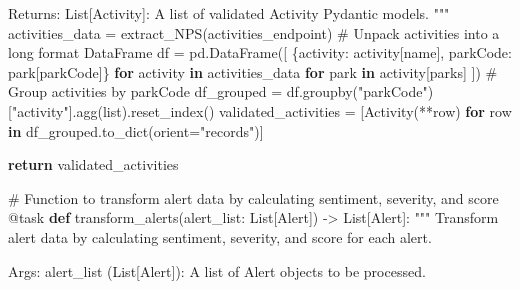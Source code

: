 \documentclass[
  letterpaper,
  DIV=11,
  numbers=noendperiod]{scrartcl}
\newenvironment{Shaded}{\begin{snugshade}}{\end{snugshade}}
\newcommand{\AttributeTok}[1]{\textcolor[rgb]{0.40,0.45,0.13}{#1}}
\newcommand{\BuiltInTok}[1]{\textcolor[rgb]{0.00,0.23,0.31}{#1}}
\newcommand{\CommentTok}[1]{\textcolor[rgb]{0.37,0.37,0.37}{#1}}
\newcommand{\ControlFlowTok}[1]{\textcolor[rgb]{0.00,0.23,0.31}{\textbf{#1}}}
\newcommand{\KeywordTok}[1]{\textcolor[rgb]{0.00,0.23,0.31}{\textbf{#1}}}
\newcommand{\NormalTok}[1]{\textcolor[rgb]{0.00,0.23,0.31}{#1}}
\newcommand{\OperatorTok}[1]{\textcolor[rgb]{0.37,0.37,0.37}{#1}}
\newcommand{\StringTok}[1]{\textcolor[rgb]{0.13,0.47,0.30}{#1}}
\begin{document}
\begin{Shaded}
\begin{Highlighting}[]
\CommentTok{    Returns:}
\CommentTok{        List[Activity]: A list of validated Activity Pydantic models.}
\CommentTok{    """}
\NormalTok{    activities\_data }\OperatorTok{=}\NormalTok{ extract\_NPS(activities\_endpoint)}
    \CommentTok{\# Unpack activities into a long format DataFrame}
\NormalTok{    df }\OperatorTok{=}\NormalTok{ pd.DataFrame([}
\NormalTok{        \{}\StringTok{\textquotesingle{}activity\textquotesingle{}}\NormalTok{: activity[}\StringTok{\textquotesingle{}name\textquotesingle{}}\NormalTok{], }\StringTok{\textquotesingle{}parkCode\textquotesingle{}}\NormalTok{: park[}\StringTok{\textquotesingle{}parkCode\textquotesingle{}}\NormalTok{]\}}
        \ControlFlowTok{for}\NormalTok{ activity }\KeywordTok{in}\NormalTok{ activities\_data}
        \ControlFlowTok{for}\NormalTok{ park }\KeywordTok{in}\NormalTok{ activity[}\StringTok{\textquotesingle{}parks\textquotesingle{}}\NormalTok{]}
\NormalTok{    ])}
    \CommentTok{\# Group activities by parkCode}
\NormalTok{    df\_grouped }\OperatorTok{=}\NormalTok{ df.groupby(}\StringTok{"parkCode"}\NormalTok{)[}\StringTok{"activity"}\NormalTok{].agg(}\BuiltInTok{list}\NormalTok{).reset\_index()}
\NormalTok{    validated\_activities }\OperatorTok{=}\NormalTok{ [Activity(}\OperatorTok{**}\NormalTok{row) }\ControlFlowTok{for}\NormalTok{ row }\KeywordTok{in}\NormalTok{ df\_grouped.to\_dict(orient}\OperatorTok{=}\StringTok{"records"}\NormalTok{)]}

    \ControlFlowTok{return}\NormalTok{ validated\_activities}

\CommentTok{\# Function to transform alert data by calculating sentiment, severity, and score}
\AttributeTok{@task}
\KeywordTok{def}\NormalTok{ transform\_alerts(alert\_list: List[Alert]) }\OperatorTok{{-}\textgreater{}}\NormalTok{ List[Alert]:}
    \CommentTok{"""}
\CommentTok{    Transform alert data by calculating sentiment, severity, and score for each alert.}

\CommentTok{    Args:}
\CommentTok{        alert\_list (List[Alert]): A list of Alert objects to be processed.}


\end{Highlighting}
\end{Shaded}
\end{document}
